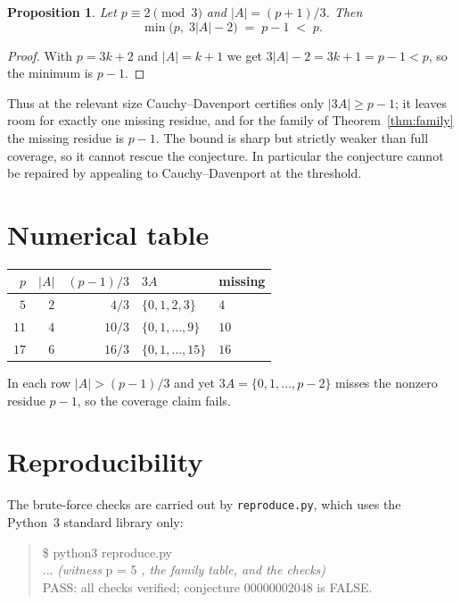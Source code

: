 \documentclass[11pt]{article}
\newtheorem{proposition}[theorem]{Proposition}
\theoremstyle{definition}
\theoremstyle{remark}
\begin{document}
\begin{proposition}\label{prop:cd}
Let $p \equiv 2 \pmod 3$ and $|A| = (p+1)/3$. Then
\[
\min\bigl(p,\; 3|A| - 2\bigr) \;=\; p - 1 \;<\; p .
\]
\end{proposition}

\begin{proof}
With $p = 3k+2$ and $|A| = k+1$ we get $3|A| - 2 = 3k + 1 = p - 1 < p$, so the
minimum is $p - 1$.
\end{proof}

Thus at the relevant size Cauchy--Davenport certifies only $|3A| \ge p-1$; it
leaves room for exactly one missing residue, and for the family of
Theorem~\ref{thm:family} the missing residue is $p-1$. The bound is sharp but
strictly weaker than full coverage, so it cannot rescue the conjecture. In
particular the conjecture cannot be repaired by appealing to
Cauchy--Davenport at the threshold.

\section{Numerical table}

\begin{center}
\begin{tabular}{r r r l l}
\toprule
$p$ & $|A|$ & $(p-1)/3$ & $3A$ & missing \\
\midrule
$5$  & $2$  & $4/3$    & $\{0,1,2,3\}$ & $4$ \\
$11$ & $4$  & $10/3$   & $\{0,1,\dots,9\}$ & $10$ \\
$17$ & $6$  & $16/3$   & $\{0,1,\dots,15\}$ & $16$ \\
\bottomrule
\end{tabular}
\end{center}

In each row $|A| > (p-1)/3$ and yet $3A = \{0, 1, \dots, p-2\}$ misses the
nonzero residue $p-1$, so the coverage claim fails.

\section{Reproducibility}

The brute-force checks are carried out by \texttt{reproduce.py}, which uses the
Python~3 standard library only:

\begin{quote}\ttfamily
\$ python3 reproduce.py\\
... \textit{(witness } p = 5 \textit{, the family table, and the checks)}\\
PASS: all checks verified; conjecture 00000002048 is FALSE.
\end{quote}
\end{document}
